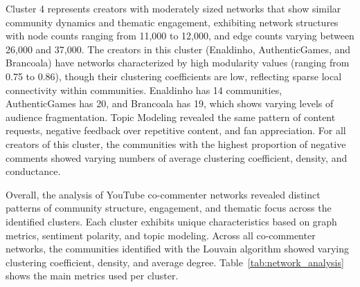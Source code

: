 \documentclass[sigconf]{acmart}
\begin{document}
Cluster 4 represents creators with moderately sized networks that show similar community dynamics and 
thematic engagement, exhibiting network structures with node counts ranging from 11,000 to 12,000, and 
edge counts varying between 26,000 and 37,000. 
The creators in this cluster (Enaldinho, AuthenticGames, and Brancoala) 
have networks characterized by high modularity values (ranging from 0.75 to 0.86), 
though their clustering coefficients are low, reflecting sparse local connectivity within communities. 
Enaldinho has 14 communities, AuthenticGames has 20, and Brancoala has 19, which shows varying levels 
of audience fragmentation. Topic Modeling revealed the same pattern of content requests, negative feedback
over repetitive content, and fan appreciation.
For all creators of this cluster, the communities with the highest proportion of negative comments showed
varying numbers of average clustering coefficient, density, and conductance.

Overall, the analysis of YouTube co-commenter networks revealed distinct patterns of community 
structure, engagement, and thematic focus across the identified clusters. 
Each cluster exhibits unique characteristics based on graph metrics, sentiment polarity, and topic modeling.
Across all co-commenter networks, the communities identified with the Louvain algorithm showed varying 
clustering coefficient, density, and average degree. Table~\ref{tab:network_analysis} shows
the main metrics used per cluster.

\begin{table}[h!]
\caption{Network Characteristics by Cluster}
\label{tab:network_analysis}
\end{table}
\end{document}
